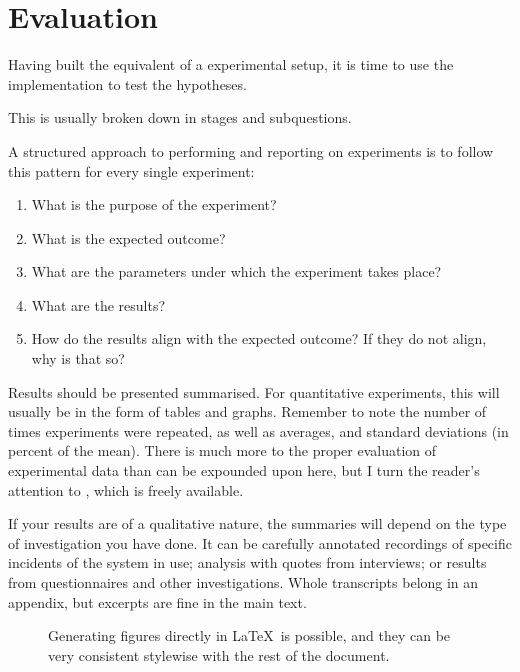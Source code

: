 \chapter{Evaluation}
\label{cha:evaluation}

Having built the equivalent of a experimental setup, it is time to use
the implementation to test the hypotheses.

This is usually broken down in stages and subquestions.

A structured approach to performing and reporting on experiments is
to follow this pattern for every single experiment:

\begin{enumerate}
\item What is the purpose of the experiment?
\item What is the expected outcome?
\item What are the parameters under which the experiment takes place?
\item What are the results?
\item How do the results align with the expected outcome? If they do not
  align, why is that so?
\end{enumerate}

Results should be presented summarised. For quantitative experiments, this
will usually be in the form of tables and graphs.  Remember to note the
number of times experiments were repeated, as well as averages, and standard
deviations (in percent of the mean).  There is much more to the proper
evaluation of experimental data than can be expounded upon here, but I turn
the reader's attention to \citep{Downey2011:TSPASFP2011}, which is freely
available.

If your results are of a qualitative nature, the summaries will depend on
the type of investigation you have done. It can be carefully annotated
recordings of specific incidents of the system in use; analysis with quotes
from interviews; or results from questionnaires and other investigations.
Whole transcripts belong in an appendix, but excerpts are fine in the main
text.



\begin{figure}
  \myfloatalign
  \caption[A graph with error bars]{Generating figures directly in \LaTeX\ is possible, and they can be very consistent stylewise with the rest of the document.}
  \label{fig:pretty-graph}
\end{figure}



